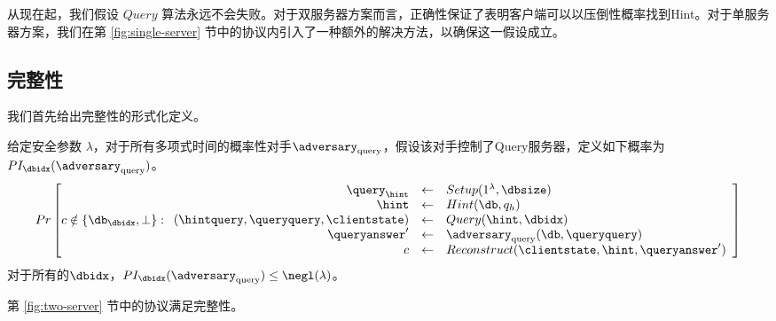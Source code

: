 从现在起，我们假设 $Query$ 算法永远不会失败。对于双服务器方案而言，正确性保证了表明客户端可以以压倒性概率找到Hint。对于单服务器方案，我们在第 \ref{fig:single-server} 节中的协议内引入了一种额外的解决方法，以确保这一假设成立。

\subsection{完整性}
\label{appendix:integrity}

我们首先给出完整性的形式化定义。

\begin{definition}[双服务器方案的完整性]
给定安全参数 $\lambda$，对于所有多项式时间的概率性对手$\adversary_{\mathrm{query}}$，假设该对手控制了Query服务器，定义如下概率为$PI_\dbidx(\adversary_{\mathrm{query}})$。
            $$ Pr\left[
            c \notin \{\db_\dbidx,\bot\}:
            \begin{array}{rcl}
                \query_\hint                          & \leftarrow & Setup(1^\lambda, \dbsize)                       \\
                \hint                                 & \leftarrow & Hint(\db, q_h)                                  \\
                (\hintquery,\queryquery,\clientstate) & \leftarrow & Query(\hint, \dbidx)                            \\
                \queryanswer'                         & \leftarrow & \adversary_{\mathrm{query}}(\db, \queryquery)   \\
                c                                     & \leftarrow & Reconstruct(\clientstate, \hint, \queryanswer') \\
            \end{array}
            \right]$$
对于所有的$\dbidx$，$PI_\dbidx(\adversary_{\mathrm{query}}) \leq \negl(\lambda)$。
\end{definition}

\begin{theorem}
    第 \ref{fig:two-server} 节中的协议满足完整性。
\end{theorem}

